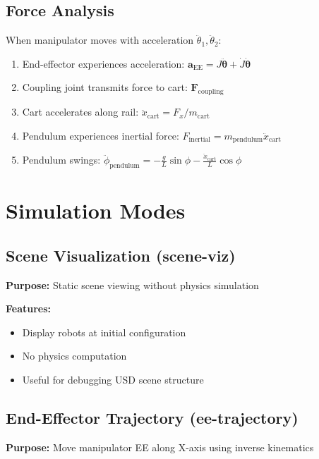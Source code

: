 \documentclass[11pt,a4paper]{article}
\begin{document}
\subsection{Force Analysis}

When manipulator moves with acceleration $\ddot{\theta}_1, \ddot{\theta}_2$:

\begin{enumerate}
    \item End-effector experiences acceleration: $\mathbf{a}_{\text{EE}} = J \ddot{\boldsymbol{\theta}} + \dot{J} \dot{\boldsymbol{\theta}}$
    \item Coupling joint transmits force to cart: $\mathbf{F}_{\text{coupling}}$
    \item Cart accelerates along rail: $\ddot{x}_{\text{cart}} = F_x / m_{\text{cart}}$
    \item Pendulum experiences inertial force: $F_{\text{inertial}} = m_{\text{pendulum}} \ddot{x}_{\text{cart}}$
    \item Pendulum swings: $\ddot{\phi}_{\text{pendulum}} = -\frac{g}{L} \sin\phi - \frac{\ddot{x}_{\text{cart}}}{L} \cos\phi$
\end{enumerate}

\section{Simulation Modes}

\subsection{Scene Visualization (scene-viz)}

\textbf{Purpose:} Static scene viewing without physics simulation

\textbf{Features:}
\begin{itemize}
    \item Display robots at initial configuration
    \item No physics computation
    \item Useful for debugging USD scene structure
\end{itemize}

\subsection{End-Effector Trajectory (ee-trajectory)}

\textbf{Purpose:} Move manipulator EE along X-axis using inverse kinematics
\end{document}
